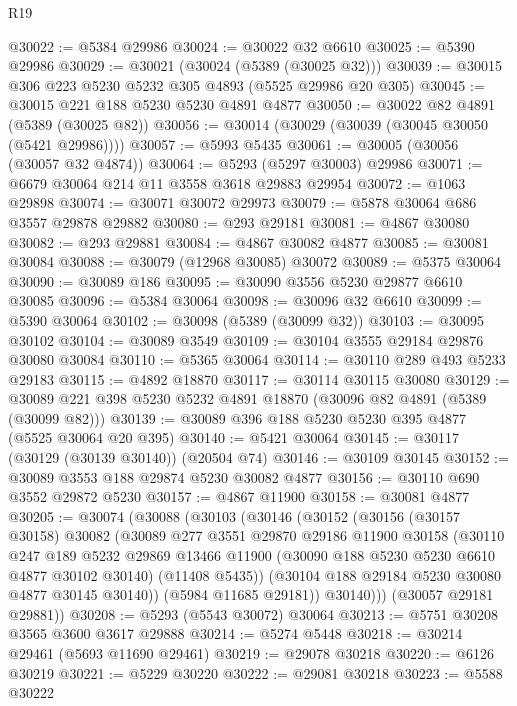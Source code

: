 \begin{lexlean}{R19}
\begin{coremodule}
@30022 := @5384 @29986
@30024 := @30022 @32 @6610
@30025 := @5390 @29986
@30029 := @30021 (@30024 (@5389 (@30025 @32)))
@30039 := @30015 @306 @223 @5230 @5232 @305 @4893 (@5525 @29986 @20 @305)
@30045 := @30015 @221 @188 @5230 @5230 @4891 @4877
@30050 := @30022 @82 @4891 (@5389 (@30025 @82))
@30056 := @30014 (@30029 (@30039 (@30045 @30050 (@5421 @29986))))
@30057 := @5993 @5435
@30061 := @30005 (@30056 (@30057 @32 @4874))
@30064 := @5293 (@5297 @30003) @29986
@30071 := @6679 @30064 @214 @11 @3558 @3618 @29883 @29954
@30072 := @1063 @29898
@30074 := @30071 @30072 @29973
@30079 := @5878 @30064 @686 @3557 @29878 @29882
@30080 := @293 @29181
@30081 := @4867 @30080
@30082 := @293 @29881
@30084 := @4867 @30082 @4877
@30085 := @30081 @30084
@30088 := @30079 (@12968 @30085) @30072
@30089 := @5375 @30064
@30090 := @30089 @186
@30095 := @30090 @3556 @5230 @29877 @6610 @30085
@30096 := @5384 @30064
@30098 := @30096 @32 @6610
@30099 := @5390 @30064
@30102 := @30098 (@5389 (@30099 @32))
@30103 := @30095 @30102
@30104 := @30089 @3549
@30109 := @30104 @3555 @29184 @29876 @30080 @30084
@30110 := @5365 @30064
@30114 := @30110 @289 @493 @5233 @29183
@30115 := @4892 @18870
@30117 := @30114 @30115 @30080
@30129 := @30089 @221 @398 @5230 @5232 @4891 @18870 (@30096 @82 @4891 (@5389 (@30099 @82)))
@30139 := @30089 @396 @188 @5230 @5230 @395 @4877 (@5525 @30064 @20 @395)
@30140 := @5421 @30064
@30145 := @30117 (@30129 (@30139 @30140)) (@20504 @74)
@30146 := @30109 @30145
@30152 := @30089 @3553 @188 @29874 @5230 @30082 @4877
@30156 := @30110 @690 @3552 @29872 @5230
@30157 := @4867 @11900
@30158 := @30081 @4877
@30205 := @30074
    (@30088
      (@30103
        (@30146
          (@30152
            (@30156
              (@30157 @30158)
              @30082
              (@30089
                @277
                @3551
                @29870
                @29186
                @11900
                @30158
                (@30110
                  @247
                  @189
                  @5232
                  @29869
                  @13466
                  @11900
                  (@30090 @188 @5230 @5230 @6610 @4877 @30102 @30140)
                  (@11408 @5435))
                (@30104 @188 @29184 @5230 @30080 @4877 @30145 @30140))
              (@5984 @11685 @29181))
            @30140)))
      (@30057 @29181 @29881))
@30208 := @5293 (@5543 @30072) @30064
@30213 := @5751 @30208 @3565 @3600 @3617 @29888
@30214 := @5274 @5448
@30218 := @30214 @29461 (@5693 @11690 @29461)
@30219 := @29078 @30218
@30220 := @6126 @30219
@30221 := @5229 @30220
@30222 := @29081 @30218
@30223 := @5588 @30222

\end{coremodule}
\end{lexlean}
